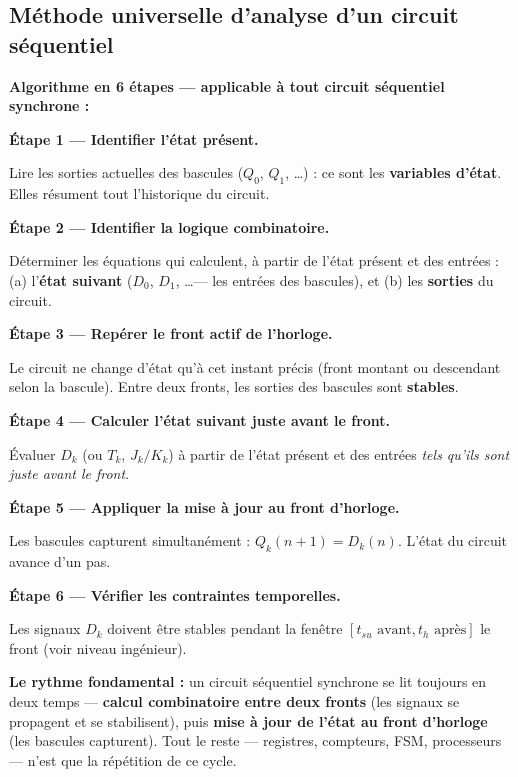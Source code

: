 \documentclass[12pt,a4paper,twoside]{book}
\begin{document}
\subsection{Méthode universelle d'analyse d'un circuit séquentiel}

\begin{pratique}
\textbf{Algorithme en 6 étapes --- applicable à tout circuit séquentiel synchrone :}

\textbf{Étape 1 --- Identifier l'état présent.}

Lire les sorties actuelles des bascules ($Q_0$, $Q_1$, \ldots) : ce sont les \textbf{variables d'état}. Elles résument tout l'historique du circuit.

\textbf{Étape 2 --- Identifier la logique combinatoire.}

Déterminer les équations qui calculent, à partir de l'état présent et des entrées : (a) l'\textbf{état suivant} ($D_0$, $D_1$, \ldots --- les entrées des bascules), et (b) les \textbf{sorties} du circuit.

\textbf{Étape 3 --- Repérer le front actif de l'horloge.}

Le circuit ne change d'état qu'à cet instant précis (front montant ou descendant selon la bascule). Entre deux fronts, les sorties des bascules sont \textbf{stables}.

\textbf{Étape 4 --- Calculer l'état suivant juste avant le front.}

Évaluer $D_k$ (ou $T_k$, $J_k/K_k$) à partir de l'état présent et des entrées \textit{tels qu'ils sont juste avant le front}.

\textbf{Étape 5 --- Appliquer la mise à jour au front d'horloge.}

Les bascules capturent simultanément : $Q_k(n+1) = D_k(n)$. L'état du circuit avance d'un pas.

\textbf{Étape 6 --- Vérifier les contraintes temporelles.}

Les signaux $D_k$ doivent être stables pendant la fenêtre $[t_{su} \text{ avant}, t_h \text{ après}]$ le front (voir niveau ingénieur).
\end{pratique}

\begin{intuition}
\textbf{Le rythme fondamental :} un circuit séquentiel synchrone se lit toujours en deux temps ---
\textbf{calcul combinatoire entre deux fronts} (les signaux se propagent et se stabilisent), puis \textbf{mise à jour de l'état au front d'horloge} (les bascules capturent). Tout le reste --- registres, compteurs, FSM, processeurs --- n'est que la répétition de ce cycle.
\end{intuition}
\end{document}
